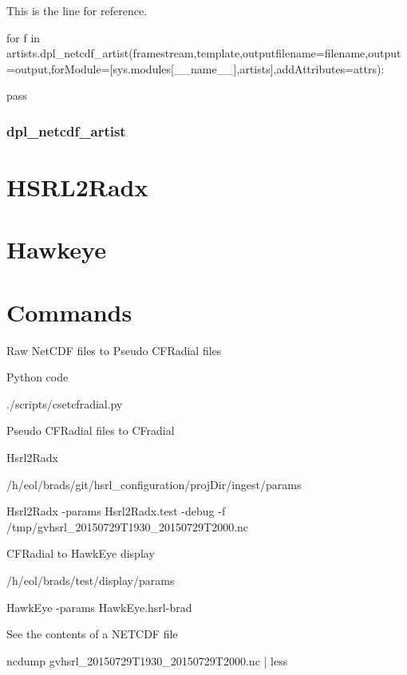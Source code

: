 \documentclass[a4paper,12pt]{article}
\begin{document}
This is the line for reference. 

\noindent for f in artists.dpl\_netcdf\_artist(framestream,template,outputfilename=filename,output=output,forModule=[sys.modules[\_\_name\_\_],artists],addAttributes=attrs):

 pass

\subsubsection{dpl\_netcdf\_artist}
\label{SECTION-dplnetcdfartist}

\section{HSRL2Radx}
\label{SECTION-HSRL2Radx}


\section{Hawkeye}
\label{SECTION-Hawkeye}

\newpage

\section{Commands}
\label{SECTION-Commands}




Raw NetCDF files to Pseudo CFRadial files

Python code 

./scripts/cset\-cfradial.py 
\newline
\newline



Pseudo CFRadial files to CFradial

Hsrl2Radx

/h/eol/brads/git/hsrl\_configuration/projDir/ingest/params

Hsrl2Radx -params Hsrl2Radx.test -debug -f /tmp/gvhsrl\_20150729T1930\_20150729T2000.nc
\newline
\newline


CFRadial to HawkEye display

/h/eol/brads/test/display/params

HawkEye -params HawkEye.hsrl-brad
\newline
\newline

See the contents of a NETCDF file

ncdump gvhsrl\_20150729T1930\_20150729T2000.nc | less



\newpage


{}

\end{document}
